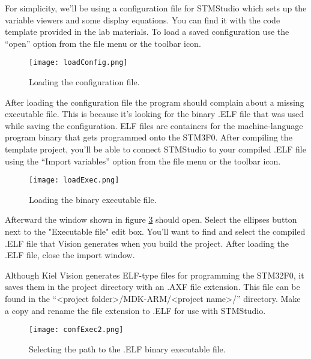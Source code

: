 \documentclass[11pt,fleqn]{book} %
\begin{document}
\noindent For simplicity, we'll be using a configuration file for STMStudio which sets up the variable viewers and some display equations. You can find it with the code template provided in the lab materials. To load a saved configuration use the ``open'' option from the file menu or the toolbar icon.


\begin{figure}[tb]
    \centering\texttt{[image: loadConfig.png]}
    \caption{Loading the configuration file.}
    \label{loadConfig}
\end{figure}

After loading the configuration file the program should complain about a missing executable file. This is because it's looking for the binary .ELF file that was used while saving the configuration. ELF files are containers for the machine-language program binary that gets programmed onto the STM3F0. After compiling the template project, you'll be able to connect STMStudio to your compiled .ELF file using the ``Import variables'' option from the file menu or the toolbar icon.




\begin{figure}[tb]
    \centering\texttt{[image: loadExec.png]}
    \caption{Loading the binary executable file.}
    \label{loadExec}
\end{figure}


Afterward the window shown in figure \ref{confExec} should open. Select the ellipses button next to the "Executable file" edit box. You'll want to find and select the compiled .ELF file that {\textmu}Vision generates when you build the project. After loading the .ELF file, close the import window.

\begin{warning}
Although Kiel {\textmu}Vision generates ELF-type files for programming the STM32F0, it saves them in the project directory with an .AXF file extension. This file can be found in the ``<project folder>/MDK-ARM/<project name>/'' directory. Make a copy and rename the file extension to .ELF for use with STMStudio. 
\end{warning}




\begin{figure}[tb]
    \centering\texttt{[image: confExec2.png]}
    \caption{Selecting the path to the .ELF binary executable file.}
    \label{confExec}
\end{figure}
\end{document}
